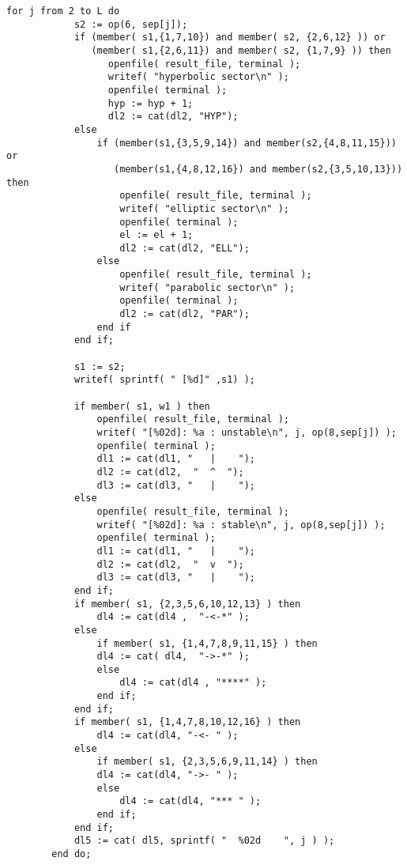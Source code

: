 \documentclass[a4paper,10pt]{article}
\begin{document}
\begin{lstlisting}[name=blowup]
        for j from 2 to L do
            s2 := op(6, sep[j]);
            if (member( s1,{1,7,10}) and member( s2, {2,6,12} )) or
               (member( s1,{2,6,11}) and member( s2, {1,7,9} )) then
                  openfile( result_file, terminal );
                  writef( "hyperbolic sector\n" );
                  openfile( terminal );
                  hyp := hyp + 1;
                  dl2 := cat(dl2, "HYP");
            else
                if (member(s1,{3,5,9,14}) and member(s2,{4,8,11,15})) or
                   (member(s1,{4,8,12,16}) and member(s2,{3,5,10,13})) then
                    openfile( result_file, terminal );
                    writef( "elliptic sector\n" );
                    openfile( terminal );
                    el := el + 1;
                    dl2 := cat(dl2, "ELL");
                else
                    openfile( result_file, terminal );
                    writef( "parabolic sector\n" );
                    openfile( terminal );
                    dl2 := cat(dl2, "PAR");
                end if
            end if;

            s1 := s2;
            writef( sprintf( " [%d]" ,s1) );

            if member( s1, w1 ) then
                openfile( result_file, terminal );
                writef( "[%02d]: %a : unstable\n", j, op(8,sep[j]) );
                openfile( terminal );
                dl1 := cat(dl1, "   |    ");
                dl2 := cat(dl2,  "  ^  ");
                dl3 := cat(dl3, "   |    ");
            else
                openfile( result_file, terminal );
                writef( "[%02d]: %a : stable\n", j, op(8,sep[j]) );
                openfile( terminal );
                dl1 := cat(dl1, "   |    ");
                dl2 := cat(dl2,  "  v  ");
                dl3 := cat(dl3, "   |    ");
            end if;
            if member( s1, {2,3,5,6,10,12,13} ) then
                dl4 := cat(dl4 ,  "-<-*" );
            else
                if member( s1, {1,4,7,8,9,11,15} ) then
                dl4 := cat( dl4,  "->-*" );
                else
                    dl4 := cat(dl4 , "****" );
                end if;
            end if;
            if member( s1, {1,4,7,8,10,12,16} ) then
                dl4 := cat(dl4, "-<- " );
            else
                if member( s1, {2,3,5,6,9,11,14} ) then
                dl4 := cat(dl4, "->- " );
                else
                    dl4 := cat(dl4, "*** " );
                end if;
            end if;
            dl5 := cat( dl5, sprintf( "  %02d    ", j ) );
        end do;


\end{lstlisting}
\end{document}
